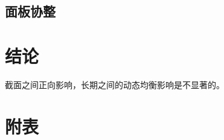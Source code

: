 \documentclass[10pt]{article}
\begin{document}
\subsection{面板协整}


\section{结论}
截面之间正向影响，长期之间的动态均衡影响是不显著的。

\renewcommand\refname{参考文献}
%	


\clearpage
\appendix
\section{附表}

\end{document}
